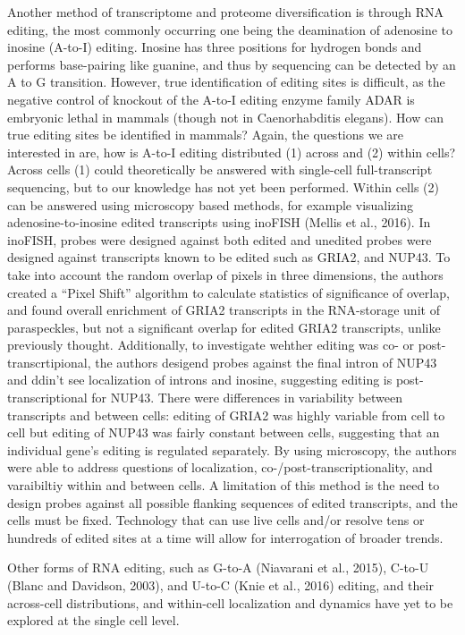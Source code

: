 Another method of transcriptome and proteome diversification is through RNA editing, the most commonly occurring one being the deamination of adenosine to inosine (A-to-I) editing. Inosine has three positions for hydrogen bonds and performs base-pairing like guanine, and thus by sequencing can be detected by an A to G transition. However, true identification of editing sites is difficult, as the negative control of knockout of the A-to-I editing enzyme family ADAR is embryonic lethal in mammals (though not in Caenorhabditis elegans). How can true editing sites be identified in mammals? Again, the questions we are interested in are, how is A-to-I editing distributed (1) across and (2) within cells? Across cells (1) could theoretically be answered with single-cell full-transcript sequencing, but to our knowledge has not yet been performed. Within cells (2) can be answered using microscopy based methods, for example visualizing adenosine-to-inosine edited transcripts using inoFISH (Mellis et al., 2016). In inoFISH, probes were designed against both edited and unedited probes were designed against transcripts known to be edited such as GRIA2, and NUP43. To take into account the random overlap of pixels in three dimensions, the authors created a ``Pixel Shift'' algorithm to calculate statistics of significance of overlap, and found overall enrichment of GRIA2 transcripts in the RNA-storage unit of paraspeckles, but not a significant overlap for edited GRIA2 transcripts, unlike previously thought. Additionally, to investigate wehther editing was co- or post-transcrtipional, the authors desigend probes against the final intron of NUP43 and ddin't see localization of introns and inosine, suggesting editing is post-transcriptional for NUP43. There were differences in variability between transcripts and between cells: editing of GRIA2 was highly variable from cell to cell but editing of NUP43 was fairly constant between cells, suggesting that an individual gene's editing is regulated separately. By using microscopy, the authors were able to address questions of localization, co-/post-transcriptionality, and varaibiltiy within and between cells. A limitation of this method is the need to design probes against all possible flanking sequences of edited transcripts, and the cells must be fixed. Technology that can use live cells and/or resolve tens or hundreds of edited sites at a time will allow for interrogation of broader trends.

Other forms of RNA editing, such as G-to-A (Niavarani et al., 2015), C-to-U (Blanc and Davidson, 2003), and U-to-C (Knie et al., 2016) editing, and their across-cell distributions, and within-cell localization and dynamics have yet to be explored at the single cell level.

